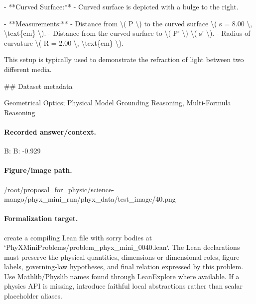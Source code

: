 - **Curved Surface:**
  - Curved surface is depicted with a bulge to the right.

- **Measurements:**
  - Distance from \textbackslash{}( P \textbackslash{}) to the curved surface \textbackslash{}( s = 8.00 \textbackslash{}, \textbackslash{}text\{cm\} \textbackslash{}).
  - Distance from the curved surface to \textbackslash{}( P' \textbackslash{}) \textbackslash{}( s' \textbackslash{}).
  - Radius of curvature \textbackslash{}( R = 2.00 \textbackslash{}, \textbackslash{}text\{cm\} \textbackslash{}).

This setup is typically used to demonstrate the refraction of light between two different media.

\#\# Dataset metadata

Geometrical Optics; Physical Model Grounding Reasoning, Multi-Formula Reasoning

\paragraph{Recorded answer/context.}
B: B: -0.929

\paragraph{Figure/image path.}
/root/proposal\_for\_physic/science-mango/phyx\_mini\_run/phyx\_data/test\_image/40.png

\paragraph{Formalization target.}
create a compiling Lean file with sorry bodies at `PhyXMiniProblems/problem\_phyx\_mini\_0040.lean`. The Lean declarations must preserve the physical quantities, dimensions or dimensional roles, figure labels, governing-law hypotheses, and final relation expressed by this problem.
Use Mathlib/Physlib names found through LeanExplore where available. If a physics API is missing, introduce faithful local abstractions rather than scalar placeholder aliases.

